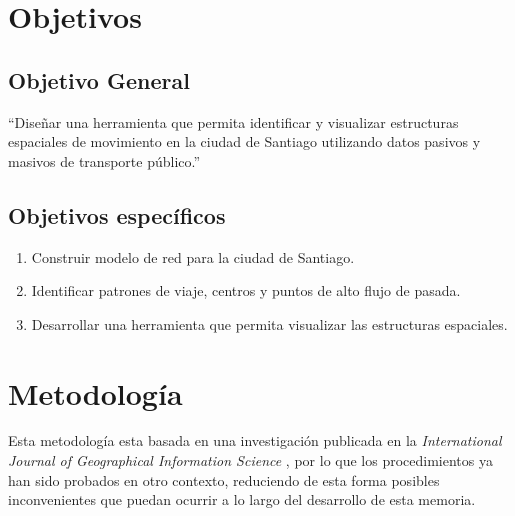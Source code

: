 \documentclass[itshape,12pt]{article}
\begin{document}
              \section{Objetivos}

          \subsection{Objetivo General}

          ``Diseñar una herramienta que permita identificar y visualizar estructuras espaciales de movimiento en la ciudad de Santiago utilizando datos pasivos y masivos de transporte público.''
              \subsection{Objetivos específicos}

          \begin{enumerate}
          \item Construir modelo de red para la ciudad de Santiago. %
              \item Identificar patrones de viaje, centros y puntos de alto flujo de pasada.
              \item Desarrollar una herramienta que permita visualizar las estructuras espaciales.
              \end{enumerate}

          \newpage
              \section{Metodología}


              Esta metodología esta basada en una investigación publicada en la \textit{International Journal of Geographical Information Science} \cite{Estructura_urbana}, por lo que los procedimientos ya han sido probados en otro contexto, reduciendo de esta forma posibles inconvenientes que puedan ocurrir a lo largo del desarrollo de esta memoria. 
\end{document}
